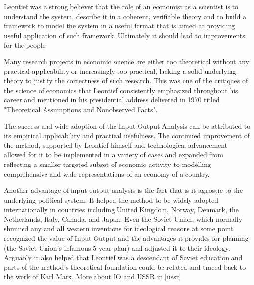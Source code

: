 \documentclass[12pt,a4paper]{scrartcl}
\begin{document}
	Leontief was a strong believer that the role of an economist as a scientist is to understand the system, describe it in a coherent, verifiable theory and to build a framework to model the system in a useful format that is aimed at providing useful application of such framework. Ultimately it should lead to improvements for the people 
	
	
	
	Many research projects in economic science are either too theoretical without any practical applicability or increasingly too practical, lacking a solid underlying theory to justify the correctness of such research. This was one of the critiques of the science of economics that Leontief consistently emphasized throughout his career and mentioned in his presidential address delivered in 1970 titled "Theoretical Assumptions and Nonobserved Facts". \cite[]{Leontief1971}
	
	The success and wide adoption of the Input Output Analysis can be attributed to its empirical applicability and practical usefulness. The continued improvement of the method, supported by Leontief himself and technological advancement allowed for it to be implemented in a variety of cases and expanded from reflecting a smaller targeted subset of economic activity to modelling comprehensive and wide representations of an economy of a country.	
	
	Another advantage of input-output analysis is the fact that is it agnostic to the underlying political system. It helped the method to be widely adopted internationally in countries including United Kingdom, Norway, Denmark, the Netherlands, Italy, Canada, and Japan. Even the Soviet Union, which normally shunned any and all western inventions for ideological reasons at some point recognized the value of Input Output and the advantages it provides for planning (the Soviet Union's infamous 5-year-plan) and adjusted it to their ideology. Arguably it also helped that Leontief was a descendant of Soviet education and parts of the method's theoretical foundation could be related and traced back to the work of Karl Marx. \cite[p.297]{rose1995} More about IO and USSR in \ref{ussr} 
\end{document}
